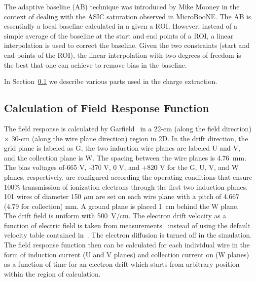 The adaptive baseline (AB) technique was introduced by Mike Mooney   
in the context of 
dealing with the ASIC saturation observed in MicroBooNE. The AB is essentially a 
local baseline calculated in a given a ROI. However, instead of a simple average of 
the baseline at the start and end points of a ROI, a linear interpolation is used to 
correct the baseline. Given the two constraints (start and end points of the ROI), 
the linear interpolation with two degrees of freedom is the best that one can achieve 
to remove bias in the baseline. 

In Section~\ref{sec:decon-frf-calc} %
we describe various parts  used in the charge extraction.

\subsection{Calculation of Field Response Function}
\label{sec:decon-frf-calc}

The field response is calculated by Garfield~\cite{garfield}   in a 22-cm (along the 
field direction) $\times$ 30-cm (along the wire plane direction) region in 2D.  
In the drift direction, the grid plane is labeled as G, the two induction %
wire 
planes are labeled U and V, and the collection plane is W.  The spacing between the wire 
planes is 4.76~mm. The bias voltages of-665 V, -370 V, 0 V, and +820 V for the G, U, V, and 
W planes, respectively, are configured according the operating conditions that ensure 100\%
    transmission of ionization electrons through the first two induction planes.  
    101 wires of diameter 150 $\mu$m are set on each wire plane with a pitch of 4.667 (4.79 for collection) mm.  A ground plane is placed 1~cm behind the W plane.  The drift
    field is uniform with 500~V/cm. The electron drift velocity as a function of
    electric field is taken from measurements~\cite{Li:2015rqa,lar_property}
    instead of using the default velocity table contained in~\cite{garfield}. %
    The electron
    diffusion is turned off in the simulation. The field response function then can
    be calculated for each individual wire in the form of induction current 
    (U and V planes) and collection current on (W planes) as a function of time for
    an electron drift which starts from arbitrary position within the region of calculation. 
    
